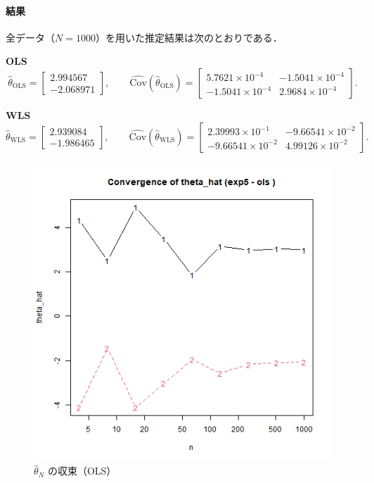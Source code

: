 \paragraph{結果}
全データ（$N=1000$）を用いた推定結果は次のとおりである．

\medskip
\noindent\textbf{OLS}
\[
  \hat{\theta}_{\mathrm{OLS}}=
  \begin{bmatrix}
    2.994567\\[-1mm]
   -2.068971
  \end{bmatrix},\qquad
  \widehat{\mathrm{Cov}}(\hat{\theta}_{\mathrm{OLS}})=
  \begin{bmatrix}
    5.7621\!\times\!10^{-4} & -1.5041\!\times\!10^{-4}\\
    -1.5041\!\times\!10^{-4} & 2.9684\!\times\!10^{-4}
  \end{bmatrix}.
\]

\noindent\textbf{WLS}
\[
  \hat{\theta}_{\mathrm{WLS}}=
  \begin{bmatrix}
    2.939084\\[-1mm]
   -1.986465
  \end{bmatrix},\qquad
  \widehat{\mathrm{Cov}}(\hat{\theta}_{\mathrm{WLS}})=
  \begin{bmatrix}
    2.39993\!\times\!10^{-1} & -9.66541\!\times\!10^{-2}\\
    -9.66541\!\times\!10^{-2} & 4.99126\!\times\!10^{-2}
  \end{bmatrix}.
\]

\begin{figure}[H]
  \centering
  \includegraphics[width=.82\linewidth]{graphs/task5_ols.png}
  \caption{$\hat{\theta}_N$ の収束（OLS）}
  \label{fig:task5_ols}
\end{figure}

